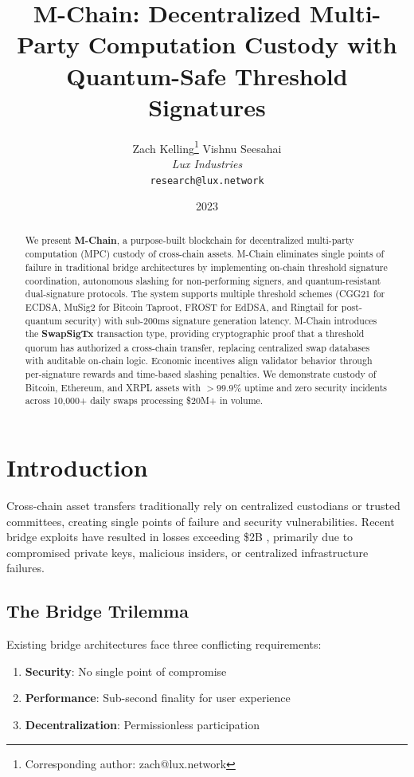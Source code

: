 \documentclass[11pt]{article}
\title{M-Chain: Decentralized Multi-Party Computation Custody with Quantum-Safe Threshold Signatures}
\author{
Zach Kelling\thanks{Corresponding author: zach@lux.network}
\quad
Vishnu Seesahai\\
\textit{Lux Industries}\\
\texttt{research@lux.network}
}
\date{2023}
\begin{document}
\luxcoverpage
\maketitle

\begin{abstract}
We present \textbf{M-Chain}, a purpose-built blockchain for decentralized multi-party computation (MPC) custody of cross-chain assets. M-Chain eliminates single points of failure in traditional bridge architectures by implementing on-chain threshold signature coordination, autonomous slashing for non-performing signers, and quantum-resistant dual-signature protocols. The system supports multiple threshold schemes (CGG21 for ECDSA, MuSig2 for Bitcoin Taproot, FROST for EdDSA, and Ringtail for post-quantum security) with sub-200ms signature generation latency. M-Chain introduces the \textbf{SwapSigTx} transaction type, providing cryptographic proof that a threshold quorum has authorized a cross-chain transfer, replacing centralized swap databases with auditable on-chain logic. Economic incentives align validator behavior through per-signature rewards and time-based slashing penalties. We demonstrate custody of Bitcoin, Ethereum, and XRPL assets with $>$99.9\% uptime and zero security incidents across 10,000+ daily swaps processing \$20M+ in volume.
\end{abstract}

\section{Introduction}

Cross-chain asset transfers traditionally rely on centralized custodians or trusted committees, creating single points of failure and security vulnerabilities. Recent bridge exploits have resulted in losses exceeding \$2B \cite{bridge-exploits-2022}, primarily due to compromised private keys, malicious insiders, or centralized infrastructure failures.

\subsection{The Bridge Trilemma}

Existing bridge architectures face three conflicting requirements:

\begin{enumerate}
\item \textbf{Security}: No single point of compromise
\item \textbf{Performance}: Sub-second finality for user experience
\item \textbf{Decentralization}: Permissionless participation
\end{enumerate}
\end{document}
